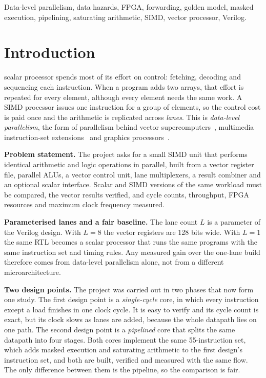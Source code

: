 \begin{IEEEkeywords}
Data-level parallelism, data hazards, FPGA, forwarding, golden model, masked
execution, pipelining, saturating arithmetic, SIMD, vector processor, Verilog.
\end{IEEEkeywords}

\section{Introduction}\label{sec:intro}

 scalar processor spends most of its effort on control: fetching,
decoding and sequencing each instruction. When a program adds two arrays, that effort
is repeated for every element, although every element needs the same work. A SIMD
processor issues one instruction for a group of elements, so the control cost is paid
once and the arithmetic is replicated across \emph{lanes}. This is
\emph{data-level parallelism}, the form of parallelism behind vector
supercomputers~\cite{cray1}, multimedia instruction-set extensions~\cite{mmx} and
graphics processors~\cite{hp6}.

\textbf{Problem statement.} The project asks for a small SIMD unit that performs
identical arithmetic and logic operations in parallel, built from a vector register
file, parallel ALUs, a vector control unit, lane multiplexers, a result combiner and
an optional scalar interface. Scalar and SIMD versions of the same workload must be
compared, the vector results verified, and cycle counts, throughput, FPGA resources
and maximum clock frequency measured.

\textbf{Parameterised lanes and a fair baseline.} The lane count $L$ is a parameter of
the Verilog design. With $L = 8$ the vector registers are 128 bits wide. With $L = 1$
the same RTL becomes a scalar processor that runs the same programs with the same
instruction set and timing rules. Any measured gain over the one-lane build therefore
comes from data-level parallelism alone, not from a different microarchitecture.

\textbf{Two design points.} The project was carried out in two phases that now form
one study. The first design point is a \emph{single-cycle} core, in which every
instruction except a load finishes in one clock cycle. It is easy to verify and its
cycle count is exact, but its clock slows as lanes are added, because the whole
datapath lies on one path. The second design point is a \emph{pipelined} core that
splits the same datapath into four stages. Both cores implement the same 55-instruction
set, which adds masked execution and saturating arithmetic to the first design's
instruction set, and both are built, verified and measured with the same flow. The
only difference between them is the pipeline, so the comparison is fair.


